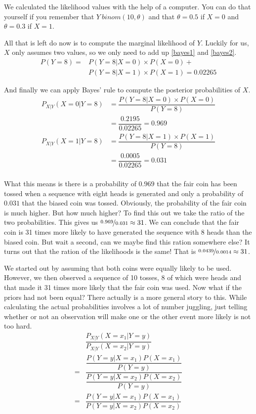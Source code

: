 We calculated the likelihood values with the help of a computer. You can do that yourself if you remember that
$ Y ~ binom(10,\theta) $ and that $ \theta=0.5 $ if $ X=0 $ and $ \theta=0.3 $ if $ X=1 $. 

All that is left do now is to compute the marginal likelihood of $ Y $. Luckily for us, $ X $ only assumes two
values, so we only need to add up \ref{bayes1} and \ref{bayes2}.
\begin{align}
P(Y=8) = &P(Y=8|X=0) \times P(X=0) + \\
&P(Y=8|X=1) \times P(X=1) = 0.02265 \nonumber
\end{align}

And finally we can apply Bayes' rule to compute the posterior probabilities of $ X $.
\begin{align}
P_{X|Y}(X=0|Y=8) &= \dfrac{P(Y=8|X=0) \times P(X=0)}{P(Y=8)} \\
&= \dfrac{0.2195}{0.02265} = 0.969 \nonumber \\
P_{X|Y}(X=1|Y=8) &= \dfrac{P(Y=8|X=1) \times P(X=1)}{P(Y=8)} \\
&= \dfrac{0.0005}{0.02265} = 0.031 \nonumber \\
\end{align}

What this means is there is a probability of $ 0.969 $ that the fair coin has been tossed when a sequence with eight heads is
generated and only a probability of $ 0.031 $ that the biased coin was tossed. Obviously, the probability of the fair 
coin is much higher. But how much higher? To find this out we take the ratio of the two probabilities. This gives us 
$ \nicefrac{0.969}{0.031} \approx 31 $. We can conclude that the fair coin is 31 times more likely to have generated the sequence with
8 heads than the biased coin. But wait a second, can we maybe find this ration somewhere else? It turns out that 
the ration of the likelihoods is the same! That is $ \nicefrac{0.0439}{0.0014} \approx 31 $.

We started out by assuming that both coins were equally likely to be used. However, we then observed a sequence of 10 tosses, 8 of 
which were heads and that made it 31 times more likely that the fair coin was used. Now what if the priors had not been equal?
There actually is a more general story to this. While calculating the actual probabilities involves a lot of number juggling, just
telling whether or not an observation will make one or the other event more likely is not too hard.
\begin{align}
&\dfrac{P_{X|Y}(X=x_{1}|Y=y)}{P_{X|Y}(X=x_{2}|Y=y)} \\[1em]
=& \dfrac{\dfrac{P(Y=y|X=x_{1})P(X=x_{1})}{P(Y=y)}}{\dfrac{P(Y=y|X=x_{2})P(X=x_{2})}{P(Y=y)}} \\[1em]
=& \dfrac{P(Y=y|X=x_{1})P(X=x_{1})}{P(Y=y|X=x_{2})P(X=x_{2})}
\end{align}

